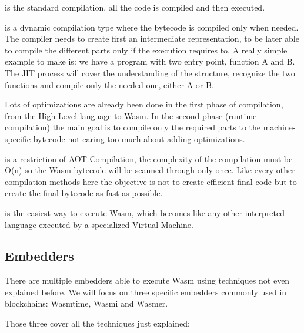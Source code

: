 \begin{description}[font=$\bullet$ \scshape\bfseries]
  \item[AOT]
        is the standard compilation, all the code is compiled and then executed.
  \item[JIT]
        is a dynamic compilation type where the bytecode is compiled only when needed. The compiler needs to create first an intermediate representation, to be later able to compile the different parts only if the execution requires to. A really simple example to make is: we have a program with two entry point, function A and B. The JIT process will cover the understanding of the structure, recognize the two functions and compile only the needed one, either A or B.

        Lots of optimizations are already been done in the first phase of compilation, from the High-Level language to Wasm. In the second phase (runtime compilation) the main goal is to compile only the required parts to the machine-specific bytecode not caring too much about adding optimizations.
  \item[SPC]
        is a restriction of AOT Compilation, the complexity of the compilation must be O(n) so the Wasm bytecode will be scanned through only once. Like every other compilation methods here the objective is not to create efficient final code but to create the final bytecode as fast as possible.
  \item[Interpretation] %
        is the easiest way to execute Wasm, which becomes like any other interpreted language executed by a specialized Virtual Machine.

\end{description}

\subsection{Embedders}

There are multiple embedders able to execute Wasm using techniques not even explained before. We will focus on three specific embedders commonly used in blockchains: Wasmtime, Wasmi and Wasmer.

Those three cover all the techniques just explained:


